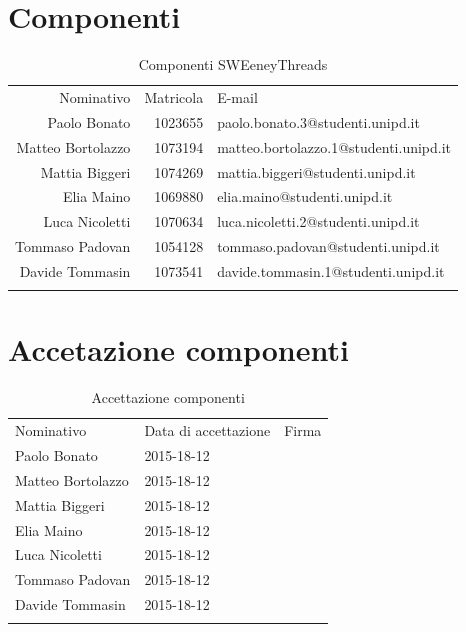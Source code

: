 \documentclass[a4paper]{report}
\begin{document}
\begin{appendices}
		\section{Componenti}
		\begin{table}[H]
			\begin{tabularx}{\textwidth}{r r k}
				Nominativo & Matricola & E-mail \\
				Paolo Bonato & 1023655 & paolo.bonato.3@studenti.unipd.it\\
				Matteo Bortolazzo & 1073194 & matteo.bortolazzo.1@studenti.unipd.it \\
				Mattia Biggeri & 1074269 & mattia.biggeri@studenti.unipd.it \\
				Elia Maino & 1069880 & elia.maino@studenti.unipd.it \\
				Luca Nicoletti & 1070634 & luca.nicoletti.2@studenti.unipd.it \\
				Tommaso Padovan & 1054128 & tommaso.padovan@studenti.unipd.it \\
				Davide Tommasin & 1073541 & davide.tommasin.1@studenti.unipd.it \\
			\end{tabularx}
			\caption{Componenti SWEeneyThreads } 
			\label{ComponentiGruppo}
		\end{table}
		\section{Accetazione componenti}
		\begin{table}[H]
			\begin{tabularx}{\textwidth}{Y Y Y}
				Nominativo & Data di accettazione & Firma\\
				Paolo Bonato & 2015-18-12 & \\
				Matteo Bortolazzo & 2015-18-12 & \\
				Mattia Biggeri & 2015-18-12 & \\
				Elia Maino & 2015-18-12 & \\
				Luca Nicoletti & 2015-18-12 & \\
				Tommaso Padovan & 2015-18-12 & \\
				Davide Tommasin & 2015-18-12 & \\
			\end{tabularx}
			\caption{Accettazione componenti } 
			\label{AccComponenti}
		\end{table}

\end{appendices}
\end{document}

